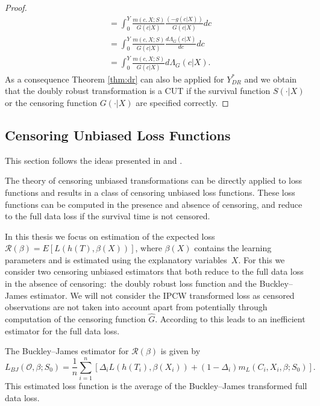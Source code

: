 \documentclass[12pt, a4paper]{scrartcl}
\theoremstyle{definition}
\theoremstyle{plain}
\numberwithin{equation}{section}
\numberwithin{figure}{section}
\numberwithin{table}{section}
\begin{document}
\begin{proof}
\begin{equation*}
\begin{split}
		& ={} \int_{0}^{Y}\frac{m(c,X;S)}{G(c\vert X)}\frac{(-g(c\vert X))}{G(c\vert X)}dc\\
		&={} \int_{0}^{Y}\frac{m(c,X;S)}{G(c\vert X)}\frac{d\Lambda_G(c \vert X)}{dc}dc\\
		&={} \int_{0}^{Y}\frac{m(c,X;S)}{G(c\vert X)}d\Lambda_G(c \vert X).
		\end{split}
		\end{equation*}
		As a consequence Theorem \ref{thm:dr} can also be applied for $Y_{DR}^*$ and we obtain that the doubly robust transformation is a CUT if the survival function $S(\cdot\vert X)$ or the censoring function $G(\cdot\vert X)$ are specified correctly.
	\end{proof}

	\subsection{Censoring Unbiased Loss Functions}\label{sec:cudls}
	This section follows the ideas presented in \citet*{culs} and \citet*{basearticle}.
	
	The theory of censoring unbiased transformations can be directly applied to loss functions and results in a class of censoring unbiased loss functions. 
	These loss functions can be computed in the presence and absence of censoring, and reduce to the full data loss if the survival time is not censored.
	
	In this thesis we focus on estimation of the expected loss~$\mathcal{R} (\beta) = E[L(h(T),\beta(X))]$, where $\beta(X)$ contains the learning parameters and is estimated using the explanatory variables~$X$.
	For this we consider two censoring unbiased estimators that both reduce to the full data loss in the absence of censoring:~the doubly robust loss function and the Buckley--James estimator.
	We will not consider the IPCW transformed loss as censored observations are not taken into account apart from potentially through computation of the censoring function $\hat{G}$.
	According to \citet*{basearticle-arxiv} this leads to an inefficient estimator for the full data loss.
	
	The Buckley--James estimator for $\mathcal{R}(\beta)$ is given by
	\begin{equation}\label{eq:bj}
	L_{BJ}(\mathcal{O}, \beta; S_0) = \frac{1}{n} \sum_{i=1}^n \left[ \Delta_i L(h(T_i), \beta(X_i))+(1-\Delta_i)m_L(C_i, X_i, \beta; S_0)\right].
	\end{equation}
	This estimated loss function is the average of the Buckley--James transformed full data loss.
	
\end{document}
